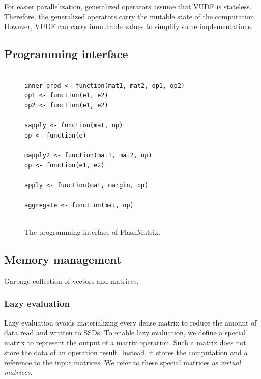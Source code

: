 For easier parallelization, generalized operators assume that VUDF is stateless.
Therefore, the generalized operators carry the mutable state of the computation.
However, VUDF can carry immutable values to simplify some implementations.

\subsection{Programming interface}
\begin{figure}[t]
\begin{verbatim}

inner_prod <- function(mat1, mat2, op1, op2)
op1 <- function(e1, e2)
op2 <- function(e1, e2)

sapply <- function(mat, op)
op <- function(e)

mapply2 <- function(mat1, mat2, op)
op <- function(e1, e2)

apply <- function(mat, margin, op)

aggregate <- function(mat, op)


\end{verbatim}
\vspace{-5pt}
\caption{The programming interface of FlashMatrix.}
\label{interface}
\end{figure}

\subsection{Memory management}
Garbage collection of vectors and matrices.


\subsubsection{Lazy evaluation} \label{sec:lazy_eval}
Lazy evaluation avoids materializing every dense matrix to reduce the amount
of data read and written to SSDs.
To enable lazy evaluation, we define a special matrix to represent the output
of a matrix operation. Such a matrix does not store the data of
an operation result. Instead, it stores the computation and a reference to
the input matrices. We refer to these special matrices as \textit{virtual matrices}.

